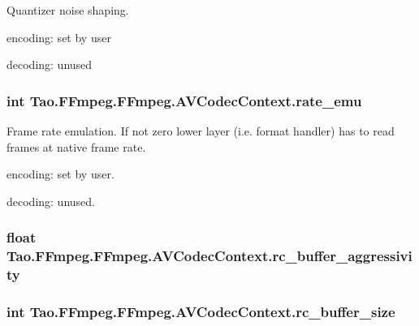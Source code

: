 \label{struct_tao_1_1_f_fmpeg_1_1_f_fmpeg_1_1_a_v_codec_context_a2b551fbb06e37e03790f4be0f0a1bb8d}
Quantizer noise shaping.
\begin{DoxyItemize}
\item encoding: set by user
\item decoding: unused 
\end{DoxyItemize}\hypertarget{struct_tao_1_1_f_fmpeg_1_1_f_fmpeg_1_1_a_v_codec_context_a4f888f5d7ac714a2df74ca234f2085bc}{
\subsubsection[{rate\_\-emu}]{\setlength{\rightskip}{0pt plus 5cm}int {\bf Tao.FFmpeg.FFmpeg.AVCodecContext.rate\_\-emu}}}
\label{struct_tao_1_1_f_fmpeg_1_1_f_fmpeg_1_1_a_v_codec_context_a4f888f5d7ac714a2df74ca234f2085bc}
Frame rate emulation. If not zero lower layer (i.e. format handler) has to read frames at native frame rate.
\begin{DoxyItemize}
\item encoding: set by user.
\item decoding: unused. 
\end{DoxyItemize}\hypertarget{struct_tao_1_1_f_fmpeg_1_1_f_fmpeg_1_1_a_v_codec_context_a7631cca143125cb09c2e3b6c63ee8ce3}{
\subsubsection[{rc\_\-buffer\_\-aggressivity}]{\setlength{\rightskip}{0pt plus 5cm}float {\bf Tao.FFmpeg.FFmpeg.AVCodecContext.rc\_\-buffer\_\-aggressivity}}}
\label{struct_tao_1_1_f_fmpeg_1_1_f_fmpeg_1_1_a_v_codec_context_a7631cca143125cb09c2e3b6c63ee8ce3}
\hypertarget{struct_tao_1_1_f_fmpeg_1_1_f_fmpeg_1_1_a_v_codec_context_aac210f61060313b8a718b990f5b8bafb}{
\subsubsection[{rc\_\-buffer\_\-size}]{\setlength{\rightskip}{0pt plus 5cm}int {\bf Tao.FFmpeg.FFmpeg.AVCodecContext.rc\_\-buffer\_\-size}}}
